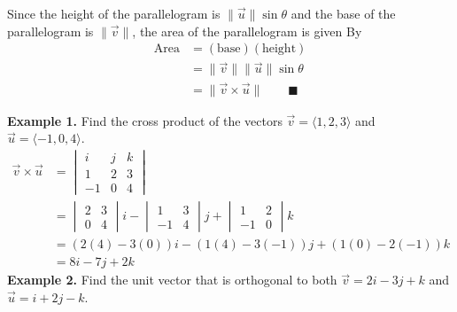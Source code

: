 \documentclass{report}
\begin{document}
Since the height of the parallelogram is $\lVert \vec{u} \rVert \sin\theta$ and the base of the parallelogram is $\lVert \vec{v} \rVert$, the area of the parallelogram is given By
\begin{align*}
    \text{Area} & = (\text{base})(\text{height})                             \\
                & = \lVert \vec{v} \rVert \lVert \vec{u} \rVert \sin\theta   \\
                & = \lVert \vec{v} \times \vec{u} \rVert \qquad \blacksquare
\end{align*}

\newpage
\noindent\textbf{Example 1. } Find the cross product of the vectors $\vec{v} = \langle 1, 2, 3 \rangle$ and $\vec{u} = \langle -1, 0, 4 \rangle$.
\begin{align*}
    \vec{v} \times \vec{u} & = \begin{vmatrix}
                                   i  & j & k \\
                                   1  & 2 & 3 \\
                                   -1 & 0 & 4
                               \end{vmatrix}                    \\
                           & = \begin{vmatrix}
                                   2 & 3 \\
                                   0 & 4
                               \end{vmatrix}i - \begin{vmatrix}
                                                    1  & 3 \\
                                                    -1 & 4
                                                \end{vmatrix}j + \begin{vmatrix}
                                                                     1  & 2 \\
                                                                     -1 & 0
                                                                 \end{vmatrix}k   \\
                           & = (2(4) - 3(0))i - (1(4) - 3(-1))j + (1(0) - 2(-1))k \\
                           & = 8i - 7j + 2k
\end{align*}
\noindent\textbf{Example 2. } Find the unit vector that is orthogonal to both $\vec{v} = 2i - 3j + k$ and $\vec{u} = i + 2j - k$.
\end{document}
